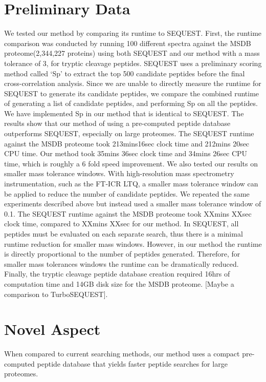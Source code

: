 \documentclass[12pt]{article}
\begin{document}
\section{Preliminary Data}
We tested our method by comparing
its runtime to SEQUEST. First, the runtime comparison was conducted by
running 100 different spectra against the MSDB proteome(2,344,227 proteins) using both
SEQUEST and our method with a mass tolerance of 3, for tryptic cleavage
peptides. SEQUEST uses a preliminary scoring method called `Sp' to
extract the top 500 candidate peptides before the final cross-correlation
analysis. Since we are unable to directly measure the runtime for SEQUEST
to generate its candidate peptides, we compare the combined runtime
of generating a list of candidate peptides, and performing Sp on all
the peptides. We have implemented Sp in our method that is identical
to SEQUEST. The results show that our method of using a pre-computed
peptide database outperforms SEQUEST, especially on large proteomes. The
SEQUEST runtime against the MSDB proteome took 213mins16sec clock time
and 212mins 20sec CPU time. Our method took 35mins 36sec clock time and
34mins 26sec CPU time, which is roughly a 6 fold speed improvement.
We also tested our results on smaller mass tolerance windows. With
high-resolution mass spectrometry instrumentation, such as the FT-ICR
LTQ, a smaller mass tolerance window can be applied to reduce the number
of candidate peptides. We repeated the same experiments described
above but instead used a smaller mass tolerance window of 0.1. The
SEQUEST runtime against the MSDB proteome took XXmins XXsec clock time,
compared to XXmins XXsec for our method. In SEQUEST, all peptides must
be evaluated on each separate search, thus there is a minimal runtime
reduction for smaller mass windows. However, in our method the runtime is
directly proportional to the number of peptides generated. Therefore, for
smaller mass tolerances windows the runtime can be dramatically reduced.
Finally, the tryptic cleavage peptide database creation required 16hrs
of computation time and 14GB disk size for the MSDB proteome. [Maybe a
comparison to TurboSEQUEST].

\section{Novel Aspect}
When compared to current searching methods,
our method uses a compact pre-computed peptide database that yields
faster peptide searches for large proteomes.
\end{document}
